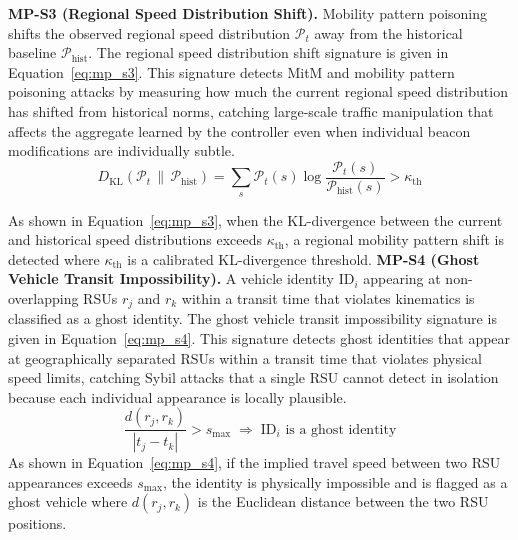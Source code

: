 \documentclass[12pt, a4paper]{report}
\begin{document}
\textbf{MP-S3 (Regional Speed Distribution Shift).}
Mobility pattern poisoning shifts the observed regional speed
distribution $\mathcal{P}_t$ away from the historical baseline
$\mathcal{P}_{\mathrm{hist}}$. The regional speed distribution shift
signature is given in Equation~\ref{eq:mp_s3}.
\newline
\newline
This signature detects MitM and mobility pattern poisoning attacks
by measuring how much the current regional speed distribution has
shifted from historical norms, catching large-scale traffic
manipulation that affects the aggregate learned by the controller
even when individual beacon modifications are individually subtle.
\begin{equation}
  D_{\mathrm{KL}}\!\left(\mathcal{P}_t \,\|\, \mathcal{P}_{\mathrm{hist}}\right)
  = \sum_{s} \mathcal{P}_t(s) \log
    \frac{\mathcal{P}_t(s)}{\mathcal{P}_{\mathrm{hist}}(s)}
  > \kappa_{\mathrm{th}}
  \label{eq:mp_s3}
\end{equation}

As shown in Equation~\ref{eq:mp_s3}, when the KL-divergence between
the current and historical speed distributions exceeds
$\kappa_{\mathrm{th}}$, a regional mobility pattern shift is detected where $\kappa_{\mathrm{th}}$ is a calibrated KL-divergence threshold.
\newline
\newline
\textbf{MP-S4 (Ghost Vehicle Transit Impossibility).}
A vehicle identity $\mathrm{ID}_i$ appearing at non-overlapping RSUs
$r_j$ and $r_k$ within a transit time that violates kinematics is
classified as a ghost identity. The ghost vehicle transit impossibility
signature is given in Equation~\ref{eq:mp_s4}.
\newline
\newline
This signature detects ghost identities that appear at
geographically separated RSUs within a transit time that violates
physical speed limits, catching Sybil attacks that a single RSU
cannot detect in isolation because each individual appearance is
locally plausible.
\begin{equation}
  \frac{d(r_j, r_k)}{|t_j - t_k|} > s_{\max}
  \;\Longrightarrow\; \mathrm{ID}_i \text{ is a ghost identity}
  \label{eq:mp_s4}
\end{equation}
As shown in Equation~\ref{eq:mp_s4}, if the implied travel
speed between two RSU appearances exceeds $s_{\max}$, the identity
is physically impossible and is flagged as a ghost vehicle where $d(r_j, r_k)$ is the Euclidean distance between the two RSU
positions.
\end{document}
